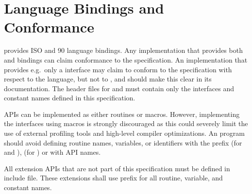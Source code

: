\section{Language Bindings and Conformance}
\label{subsec:bindings}

\openshmem provides ISO \Clang{} and \Fortran{} 90 language bindings. Any implementation that provides both \Clang{} and \Fortran{} bindings can claim conformance to the specification. An implementation that provides e.g.\ only a \Clang{} interface may claim to conform to the \openshmem specification with respect to
the \Clang{} language, but not to \Fortran{}, and should make this clear in its documentation. The \openshmem header files for \Clang{} and \Fortran{} must contain only the interfaces and constant names defined in this specification.

\openshmem{} \ac{API}s can be implemented as either routines or macros. However, implementing the interfaces using macros is strongly discouraged as this could severely limit the use of external profiling tools and high-level compiler optimizations. An \openshmem{} program should avoid defining routine names, variables, or
identifiers with the prefix \shmemprefix{} (for \Clang{} and \Fortran{}), \shmemprefixC{} (for \Clang{}) or with \openshmem \ac{API} names.

All \openshmem extension \ac{API}s that are not part of this specification must be defined in  include file. These extensions shall use  prefix for all routine, variable, and constant names.


 
%

